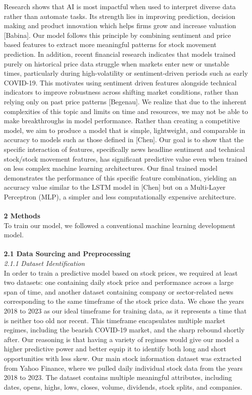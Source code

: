\documentclass[letterpaper,12pt, twocolumn]{report}
\begin{document}
Research shows that AI is most impactful when used to interpret diverse data rather than automate tasks. Its strength lies in improving prediction, decision making and product innovation which helps firms grow and increase valuation [Babina]. Our model follows this principle by combining sentiment and price based features to extract more meaningful patterns for stock movement prediction. 
In addition, recent financial research indicates that models trained purely on historical price data struggle when markets enter new or unstable times, particularly during high-volatility or sentiment-driven periods such as early COVID-19. This motivates using sentiment driven features alongside technical indicators to improve robustness across shifting market conditions, rather than relying only on past price patterns [Begenau]. 
We realize that due to the inherent complexities of this topic and limits on time and resources, we may not be able to make breakthroughs in model performance. Rather than creating a competitive model, we aim to produce a model that is simple, lightweight, and comparable in accuracy to models such as those defined in [Chen]. Our goal is to show that the specific interaction of features, specifically news headline sentiment and technical stock/stock movement features, has significant predictive value even when trained on less complex machine learning architectures. Our final trained model demonstrates the performance of this specific feature combination, yielding an accuracy value similar to the LSTM model in [Chen] but on a Multi-Layer Perceptron (MLP), a simpler and less computationally expensive architecture. \\\\
\large
\noindent
\textbf{2 Methods} \\
\normalsize
To train our model, we followed a conventional machine learning development model.\\\\
\noindent
\textbf{2.1 Data Sourcing and Preprocessing}\\
\textit{2.1.1 Dataset Identification}\\
In order to train a predictive model based on stock prices, we required at least two datasets: one containing daily stock price and performance across a large span of time, and another dataset containing company or sector-related news corresponding to the same timeframe of the stock price data. We chose the years 2018 to 2023 as our ideal timeframe for training data, as it represents a time that is neither too old nor recent. This timeframe encapsulates multiple market regimes, including the bearish COVID-19 market, and the sharp rebound shortly after. Our reasoning is that having a variety of regimes would give our model a higher predictive power and better equip it to identify both long and short opportunities with less skew. Our main stock information dataset was extracted from Yahoo Finance, where we pulled daily individual stock data from the years 2018 to 2023. The dataset contains multiple meaningful attributes, including dates, opens, highs, lows, closes, volume, dividends, stock splits, and companies.
\end{document}
